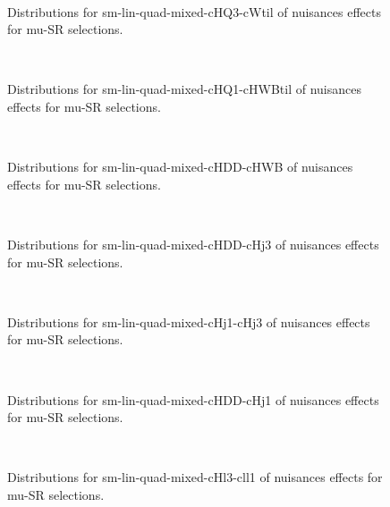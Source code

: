 \begin{figure}[htbp]  
\centering 
\\ 
\caption{ 
   Distributions for sm-lin-quad-mixed-cHQ3-cWtil of nuisances effects for mu-SR selections.
} 
\label{fig:sm_lin_quad_mixed_cHQ3_cWtil_mu_SR} 
\end{figure} 




\begin{figure}[htbp]  
\centering 
\\ 
\caption{ 
   Distributions for sm-lin-quad-mixed-cHQ1-cHWBtil of nuisances effects for mu-SR selections.
} 
\label{fig:sm_lin_quad_mixed_cHQ1_cHWBtil_mu_SR} 
\end{figure} 




\begin{figure}[htbp]  
\centering 
\\ 
\caption{ 
   Distributions for sm-lin-quad-mixed-cHDD-cHWB of nuisances effects for mu-SR selections.
} 
\label{fig:sm_lin_quad_mixed_cHDD_cHWB_mu_SR} 
\end{figure} 




\begin{figure}[htbp]  
\centering 
\\ 
\caption{ 
   Distributions for sm-lin-quad-mixed-cHDD-cHj3 of nuisances effects for mu-SR selections.
} 
\label{fig:sm_lin_quad_mixed_cHDD_cHj3_mu_SR} 
\end{figure} 




\begin{figure}[htbp]  
\centering 
\\ 
\caption{ 
   Distributions for sm-lin-quad-mixed-cHj1-cHj3 of nuisances effects for mu-SR selections.
} 
\label{fig:sm_lin_quad_mixed_cHj1_cHj3_mu_SR} 
\end{figure} 




\begin{figure}[htbp]  
\centering 
\\ 
\caption{ 
   Distributions for sm-lin-quad-mixed-cHDD-cHj1 of nuisances effects for mu-SR selections.
} 
\label{fig:sm_lin_quad_mixed_cHDD_cHj1_mu_SR} 
\end{figure} 




\begin{figure}[htbp]  
\centering 
\\ 
\caption{ 
   Distributions for sm-lin-quad-mixed-cHl3-cll1 of nuisances effects for mu-SR selections.
} 
\label{fig:sm_lin_quad_mixed_cHl3_cll1_mu_SR} 
\end{figure} 




